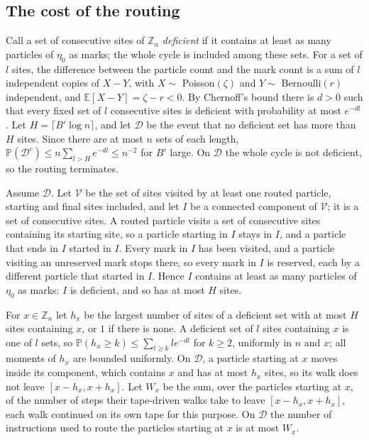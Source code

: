 \documentclass[11pt]{amsart}
\theoremstyle{remark}
\newcommand{\Z}{\mathbb Z}
\newcommand{\E}{\mathbb E}
\renewcommand{\Pr}{\mathbb P}
\begin{document}
\subsection*{The cost of the routing}
Call a set of consecutive sites of $\Z_n$ \emph{deficient} if it contains at least as many particles of $\eta_0$ as
marks; the whole cycle is included among these sets. For a set of $l$ sites, the difference between the particle count
and the mark count is a sum of $l$ independent copies of $X-Y$, with $X\sim$ Poisson$(\zeta)$ and $Y\sim$ Bernoulli$(r)$
independent, and $\E[X-Y]=\zeta-r<0$. By Chernoff's bound there is $d>0$ such that every fixed set of $l$ consecutive sites is
deficient with probability at most $e^{-dl}$. Let $H=\lceil B'\log n\rceil$, and let $\mathcal D$ be the event that no
deficient set has more than $H$ sites. Since there are at most $n$ sets of each length,
$\Pr(\mathcal D^c)\le n\sum_{l>H}e^{-dl}\le n^{-2}$ for $B'$ large. On $\mathcal D$ the whole cycle is not deficient,
so the routing terminates.

Assume $\mathcal D$. Let $\mathcal V$ be the set of sites visited by at least one routed particle, starting and final
sites included, and let $I$ be a connected component of $\mathcal V$; it is a set of consecutive sites. A routed particle
visits a set of consecutive sites containing its starting site, so a particle starting in $I$ stays in $I$, and a particle
that ends in $I$ started in $I$. Every mark in $I$ has been visited, and a particle visiting an unreserved mark stops
there, so every mark in $I$ is reserved, each by a different particle that started in $I$. Hence $I$ contains at least as
many particles of $\eta_0$ as marks: $I$ is deficient, and so has at most $H$ sites.

For $x\in\Z_n$ let $h_x$ be the largest number of sites of a deficient set with at most $H$ sites containing $x$, or $1$
if there is none. A deficient set of $l$ sites containing $x$ is one of $l$ sets, so $\Pr(h_x\ge k)\le\sum_{l\ge k}le^{-dl}$
for $k\ge2$, uniformly in $n$ and $x$; all moments of $h_x$ are bounded uniformly. On $\mathcal D$, a particle starting at
$x$ moves inside its component, which contains $x$ and has at most $h_x$ sites, so its walk does not leave
$[x-h_x,x+h_x]$. Let $W_x$ be the sum, over the particles starting at $x$, of the number of steps their tape-driven walks
take to leave $[x-h_x,x+h_x]$, each walk continued on its own tape for this purpose. On $\mathcal D$ the number of
instructions used to route the particles starting at $x$ is at most $W_x$.
\end{document}
